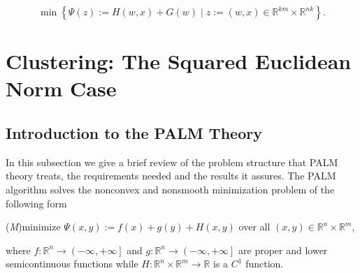\documentclass[11pt]{article}
\numberwithin{equation}{section}
\begin{document}
\begin{equation}
	\min \left\lbrace \Psi(z) := H(w,x) + G(w) \mid z := (w,x) \in \mathbb{R}^{km} \times \mathbb{R}^{nk} \right\rbrace . \label{StateEq4}
\end{equation}


\section{Clustering: The Squared Euclidean Norm Case} \label{State_Clustering_SqNorm}

\subsection{Introduction to the PALM Theory} \label{State_PALM_Theory}

In this subsection we give a brief review of the problem structure that PALM theory treats, the requirements needed and the results it assures.
The PALM algorithm solves the nonconvex and nonsmooth minimization problem of the following form
\begin{center}
(\textit{M})\quad minimize $\Psi(x,y):=f(x)+g(y)+H(x,y)$ over all $(x,y) \in \mathbb{R}^n \times \mathbb{R}^m$,
\end{center}
where $f:\mathbb{R}^n \rightarrow \left(-\infty,+\infty\right]$ and $g:\mathbb{R}^n \rightarrow \left(-\infty,+\infty\right]$ are proper and lower semicontinuous functions while $H:\mathbb{R}^n \times \mathbb{R}^m \rightarrow \mathbb{R}$ is a $C^1$ function.
\end{document}
